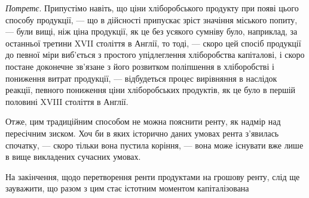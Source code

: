 \emph{Потретє}. Припустімо навіть, що ціни хліборобського продукту при
появі цього способу продукції, — що в дійсності припускає зріст значіння міського
попиту, — були вищі, ніж ціна продукції, як це без усякого сумніву було,
наприклад, за останньої третини XVII століття в Англії, то тоді, — скоро цей
спосіб продукції до певної міри виб’ється з простого упідлеглення хліборобства
капіталові, і скоро постане доконечне зв’язане з його розвитком поліпшення
в хліборобстві і пониження витрат продукції, — відбудеться процес вирівняння
в наслідок реакції, певного пониження ціни хліборобських продуктів, як це
було в першій половині XVIII століття в Англії.

Отже, цим традиційним способом не можна пояснити ренту, як надмір
над пересічним зиском. Хоч би в яких історично даних умовах рента з’явилась
спочатку, — скоро тільки вона пустила коріння, — вона може існувати вже
лише в вище викладених сучасних умовах.

На закінчення, щодо перетворення ренти продуктами на грошову ренту,
слід ще зауважити, що разом з цим стає істотним моментом капіталізована
\parbreak{}  %
